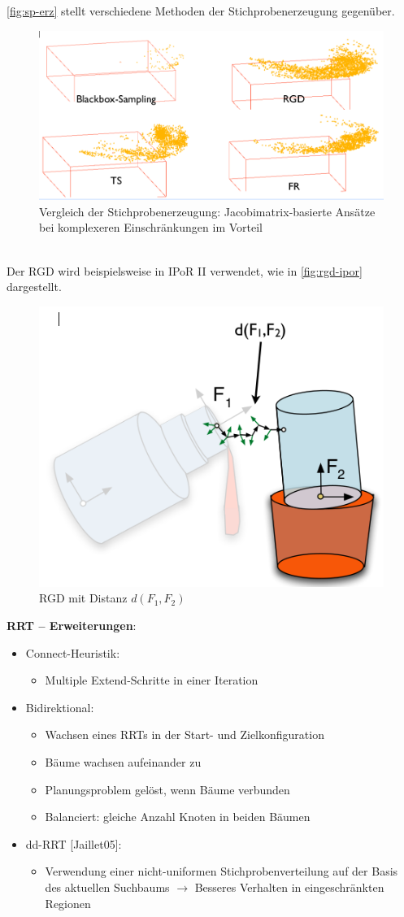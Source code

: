\autoref{fig:sp-erz} stellt verschiedene Methoden der Stichprobenerzeugung gegenüber.
\begin{figure}[h!]
	\centering
	\includegraphics[width=.5\textwidth]{figures/ch04_sp-erz.png}
	\caption{Vergleich der Stichprobenerzeugung: Jacobimatrix-basierte Ansätze bei komplexeren Einschränkungen im Vorteil}
	\label{fig:sp-erz}
\end{figure}\\
Der RGD wird beispielsweise in IPoR II verwendet, wie in \autoref{fig:rgd-ipor} dargestellt.
\begin{figure}[h!]
	\centering
	\includegraphics[width=.3\textwidth]{figures/ch04_rgd-ipor.png}
	\caption{RGD mit Distanz $d(F_1 ,F_2)$}
	\label{fig:rgd-ipor}
\end{figure}
\newpage
\textbf{RRT -- Erweiterungen}:
\begin{itemize}
\item Connect-Heuristik:
\begin{itemize}
\item Multiple Extend-Schritte in einer Iteration
\end{itemize}
\item Bidirektional:
\begin{itemize}
\item Wachsen eines RRTs in der Start- und Zielkonfiguration
\item Bäume wachsen aufeinander zu
\item Planungsproblem gelöst, wenn Bäume verbunden
\item Balanciert: gleiche Anzahl Knoten in beiden Bäumen
\end{itemize}
\item dd-RRT [Jaillet05]:
\begin{itemize}
\item Verwendung einer nicht-uniformen Stichprobenverteilung auf der Basis des aktuellen Suchbaums $\rightarrow$ Besseres Verhalten in eingeschränkten Regionen
\end{itemize}
\end{itemize}
